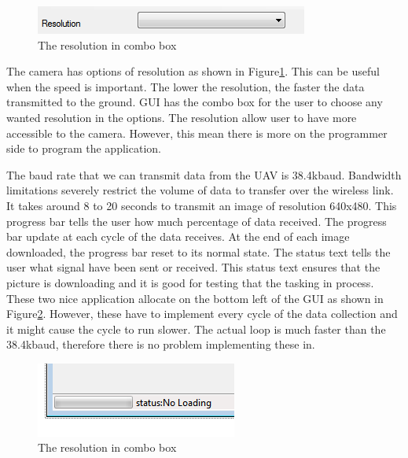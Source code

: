 \begin{figure}[H]
\begin{center}
\includegraphics[scale=1]{figures/resolutionOption.png} 
\end{center}
\caption{The resolution in combo box\label{resolutionOption}}
\end{figure}
The camera has options of resolution as shown in Figure\ref{resolutionOption}. This can be useful when the speed is important. The lower the resolution, the faster the data transmitted to the ground. GUI has the combo box for the user to choose any wanted resolution in the options. The resolution allow user to have more accessible to the camera. However, this mean there is more on the programmer side to program the application.


The baud rate that we can transmit data from the UAV is 38.4kbaud. Bandwidth limitations severely restrict the volume of data to transfer over the wireless link. It takes around 8 to 20 seconds to transmit an image of resolution 640x480. This progress bar tells the user how much percentage of data received. The progress bar update at each cycle of the data receives. At the end of each image downloaded, the progress bar reset to its normal state.  The status text tells the user what signal have been sent or received. This status text ensures that the picture is downloading and it is good for testing that the tasking in process. These two nice application allocate on the bottom left of the GUI as shown in Figure\ref{progressBar}. However, these have to implement every cycle of the data collection and it might cause the cycle to run slower. The actual loop is much faster than the 38.4kbaud, therefore there is no problem implementing these in.
\begin{figure}[!hbtp]
\begin{center}
\includegraphics[scale=1]{figures/progressBar.png} 
\end{center}
\caption{The resolution in combo box\label{progressBar}}
\end{figure}



